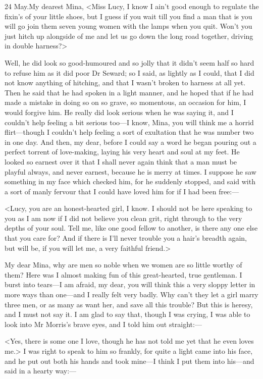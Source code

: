 \begin{mail}{24 May.}{My dearest Mina,}
<Miss Lucy, I know I ain't good enough to regulate the fixin's of your little shoes, but I guess if you wait till you find a man that is you will go join them seven young women with the lamps when you quit. Won't you just hitch up alongside of me and let us go down the long road together, driving in double harness?>

Well, he did look so good-humoured and so jolly that it didn't seem half so hard to refuse him as it did poor Dr Seward; so I said, as lightly as I could, that I did not know anything of hitching, and that I wasn't broken to harness at all yet. Then he said that he had spoken in a light manner, and he hoped that if he had made a mistake in doing so on so grave, so momentous, an occasion for him, I would forgive him. He really did look serious when he was saying it, and I couldn't help feeling a bit serious too—I know, Mina, you will think me a horrid flirt—though I couldn't help feeling a sort of exultation that he was number two in one day. And then, my dear, before I could say a word he began pouring out a perfect torrent of love-making, laying his very heart and soul at my feet. He looked so earnest over it that I shall never again think that a man must be playful always, and never earnest, because he is merry at times. I suppose he saw something in my face which checked him, for he suddenly stopped, and said with a sort of manly fervour that I could have loved him for if I had been free:—

<Lucy, you are an honest-hearted girl, I know. I should not be here speaking to you as I am now if I did not believe you clean grit, right through to the very depths of your soul. Tell me, like one good fellow to another, is there any one else that you care for? And if there is I'll never trouble you a hair's breadth again, but will be, if you will let me, a very faithful friend.>

My dear Mina, why are men so noble when we women are so little worthy of them? Here was I almost making fun of this great-hearted, true gentleman. I burst into tears—I am afraid, my dear, you will think this a very sloppy letter in more ways than one—and I really felt very badly. Why can't they let a girl marry three men, or as many as want her, and save all this trouble? But this is heresy, and I must not say it. I am glad to say that, though I was crying, I was able to look into Mr Morris's brave eyes, and I told him out straight:—

<Yes, there is some one I love, though he has not told me yet that he even loves me.> I was right to speak to him so frankly, for quite a light came into his face, and he put out both his hands and took mine—I think I put them into his—and said in a hearty way:—


\end{mail}
